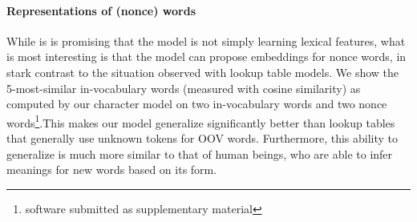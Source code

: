 \documentclass[11pt]{article}
\newcommand{\ignore}[1]{}
\newcommand{\examp}[1]{\emph{#1}}
\begin{document}
\begin{CJK*}{UTF8}{gbsn}
\paragraph{Representations of (nonce) words}
While is is promising that the model is not simply learning lexical features, what is most interesting is that the model can propose embeddings for nonce words, in stark contrast to the situation observed with lookup table models. We show the 5-most-similar in-vocabulary words (measured with cosine similarity) as computed by our character model on two in-vocabulary words and two nonce words\footnote{software submitted as supplementary material}.\ignore{
For instance, if we add to the word \examp{phd} the suffix \examp{-ing}, it will respond with a top-10 list comprising of verbs and adjectives as these are the most likely word functions for the invented word, based on the suffix. If we take a proper name \examp{Noah} and add \examp{shire}, we obtain a list with the names of many locations, such as Petersburg and Zurich. This is because, many locations are composed of peoples names followed by suffixes, such as \examp{burg}, \examp{shire} and \examp{land}, and these regularities are captured by our model.}This makes our model generalize significantly better than lookup tables that generally use unknown tokens for OOV words. Furthermore, this ability to generalize is much more similar to that of human beings, who are able to infer meanings for new words based on its form.

\begin{table}
\begin{center}
\end{center}
\caption{\label{top-5} Most-similar in-vocabular words under the C2W model; the two query words on the left are in the training vocabulary, those on the right are nonce (invented) words.}
\end{table} 


\end{CJK*}
\end{document}
